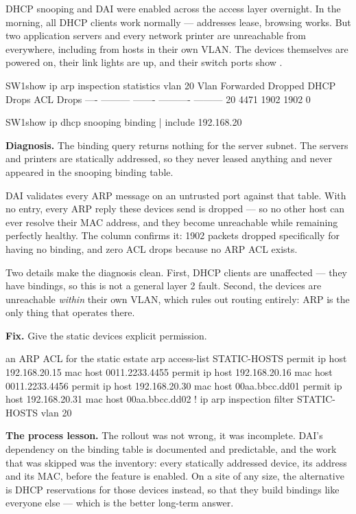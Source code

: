 \begin{breakfix}
DHCP snooping and DAI were enabled across the access layer overnight. In the
morning, all DHCP clients work normally --- addresses lease, browsing works. But
two application servers and every network printer are unreachable from
everywhere, including from hosts in their own VLAN. The devices themselves are
powered on, their link lights are up, and their switch ports show
.

\begin{verify}{SW1}{show ip arp inspection statistics vlan 20}
 Vlan      Forwarded        Dropped     DHCP Drops      ACL Drops
 ----      ---------        -------     ----------      ---------
   20           4471           1902           1902              0
\end{verify}

\begin{verify}{SW1}{show ip dhcp snooping binding | include 192.168.20}
\end{verify}

\textbf{Diagnosis.} The binding query returns nothing for the server subnet. The
servers and printers are statically addressed, so they never leased anything and
never appeared in the snooping binding table.

DAI validates every ARP message on an untrusted port against that table. With no
entry, every ARP reply these devices send is dropped --- so no other host can
ever resolve their MAC address, and they become unreachable while remaining
perfectly healthy. The  column confirms it: 1902 packets dropped
specifically for having no binding, and zero ACL drops because no ARP ACL exists.

Two details make the diagnosis clean. First, DHCP clients are unaffected ---
they have bindings, so this is not a general layer 2 fault. Second, the devices
are unreachable \emph{within} their own VLAN, which rules out routing entirely:
ARP is the only thing that operates there.

\textbf{Fix.} Give the static devices explicit permission.

\begin{config}{an ARP ACL for the static estate}
arp access-list STATIC-HOSTS
 permit ip host 192.168.20.15 mac host 0011.2233.4455
 permit ip host 192.168.20.16 mac host 0011.2233.4456
 permit ip host 192.168.20.30 mac host 00aa.bbcc.dd01
 permit ip host 192.168.20.31 mac host 00aa.bbcc.dd02
!
ip arp inspection filter STATIC-HOSTS vlan 20
\end{config}

\textbf{The process lesson.} The rollout was not wrong, it was incomplete. DAI's
dependency on the binding table is documented and predictable, and the work that
was skipped was the inventory: every statically addressed device, its address and
its MAC, before the feature is enabled. On a site of any size, the alternative is
DHCP reservations for those devices instead, so that they build bindings like
everyone else --- which is the better long-term answer.
\end{breakfix}

